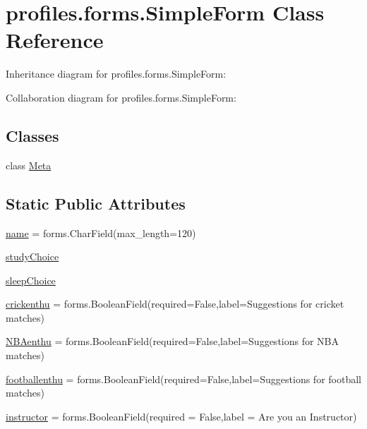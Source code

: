 \hypertarget{classprofiles_1_1forms_1_1SimpleForm}{}\section{profiles.\+forms.\+Simple\+Form Class Reference}
\label{classprofiles_1_1forms_1_1SimpleForm}


Inheritance diagram for profiles.\+forms.\+Simple\+Form\+:


Collaboration diagram for profiles.\+forms.\+Simple\+Form\+:
\subsection*{Classes}
\begin{DoxyCompactItemize}
\item 
class \hyperlink{classprofiles_1_1forms_1_1SimpleForm_1_1Meta}{Meta}
\end{DoxyCompactItemize}
\subsection*{Static Public Attributes}
\begin{DoxyCompactItemize}
\item 
\hyperlink{classprofiles_1_1forms_1_1SimpleForm_a27db91136cd11af5441ac0a5df111c24}{name} = forms.\+Char\+Field(max\+\_\+length=120)
\item 
\hyperlink{classprofiles_1_1forms_1_1SimpleForm_ada90dea452920f838181a9984b90e965}{study\+Choice}
\item 
\hyperlink{classprofiles_1_1forms_1_1SimpleForm_ad6fcf3df4c2d202e9a1c40f9e5f2c226}{sleep\+Choice}
\item 
\hyperlink{classprofiles_1_1forms_1_1SimpleForm_a2c83193b1e44093b0f631842847a1931}{crickenthu} = forms.\+Boolean\+Field(required=False,label=\textquotesingle{}Suggestions for cricket matches\textquotesingle{})
\item 
\hyperlink{classprofiles_1_1forms_1_1SimpleForm_a791fd8196dfe174afb185e8f0357d807}{N\+B\+Aenthu} = forms.\+Boolean\+Field(required=False,label=\textquotesingle{}Suggestions for N\+BA matches\textquotesingle{})
\item 
\hyperlink{classprofiles_1_1forms_1_1SimpleForm_a1ba5ebb75a3a8343d641d558ae85627b}{footballenthu} = forms.\+Boolean\+Field(required=False,label=\textquotesingle{}Suggestions for football matches\textquotesingle{})
\item 
\hyperlink{classprofiles_1_1forms_1_1SimpleForm_a230df5633ff8ea343d627abe65564577}{instructor} = forms.\+Boolean\+Field(required = False,label = \textquotesingle{}Are you an Instructor\textquotesingle{})
\end{DoxyCompactItemize}


